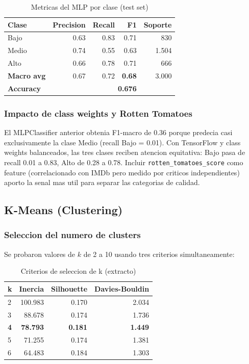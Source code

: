 \documentclass[12pt, a4paper]{article}
\begin{document}
\begin{table}[H]
\centering
\caption{Metricas del MLP por clase (test set)}
\begin{tabular}{lrrrr}
\toprule
\textbf{Clase} & \textbf{Precision} & \textbf{Recall} & \textbf{F1} & \textbf{Soporte} \\
\midrule
Bajo  & 0.63 & 0.83 & 0.71 &   830 \\
Medio & 0.74 & 0.55 & 0.63 & 1.504 \\
Alto  & 0.66 & 0.78 & 0.71 &   666 \\
\midrule
\textbf{Macro avg}  & 0.67 & 0.72 & \textbf{0.68} & 3.000 \\
\textbf{Accuracy}   & \multicolumn{3}{r}{\textbf{0.676}} & \\
\bottomrule
\end{tabular}
\end{table}

\subsubsection{Impacto de class weights y Rotten Tomatoes}

El MLPClassifier anterior obtenia F1-macro de 0.36 porque predecia casi exclusivamente la clase Medio (recall Bajo = 0.01). Con TensorFlow y class weights balanceados, las tres clases reciben atencion equitativa: Bajo pasa de recall 0.01 a 0.83, Alto de 0.28 a 0.78. Incluir \texttt{rotten\_tomatoes\_score} como feature (correlacionado con IMDb pero medido por criticos independientes) aporto la senal mas util para separar las categorias de calidad.

\subsection{K-Means (Clustering)}

\subsubsection{Seleccion del numero de clusters}

Se probaron valores de $k$ de 2 a 10 usando tres criterios simultaneamente:

\begin{table}[H]
\centering
\caption{Criterios de seleccion de k (extracto)}
\begin{tabular}{lrrr}
\toprule
\textbf{k} & \textbf{Inercia} & \textbf{Silhouette} & \textbf{Davies-Bouldin} \\
\midrule
2  & 100.983 & 0.170 & 2.034 \\
3  &  88.678 & 0.174 & 1.736 \\
\textbf{4}  & \textbf{78.793} & \textbf{0.181} & \textbf{1.449} \\
5  &  71.255 & 0.174 & 1.381 \\
6  &  64.483 & 0.184 & 1.303 \\
\bottomrule
\end{tabular}
\end{table}
\end{document}
